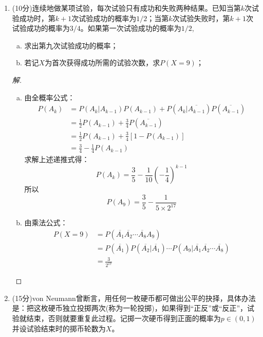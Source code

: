 \documentclass[12pt]{article}
\newcommand{\hei}{\CJKfamily{hei}}                          %
\begin{document}
\begin{enumerate}
\item {\hei (10分)连续地做某项试验，每次试验只有成功和失败两种结果。已知当第$k$次试验成功时，第$k+1$次试验成功的概率为$1/2$；当第$k$次试验失败时，第$k+1$次试验成功的概率为$3/4$。如果第一次试验成功的概率为$1/2$,
\begin{enumerate}[(a)]
	\item 求出第九次试验成功的概率；
	\item 若记$X$为首次获得成功所需的试验次数，求$P(X=9)$；
\end{enumerate}}
\begin{proof}[解]
	\begin{enumerate}[(a)]
		\item 由全概率公式：
		\begin{equation*}
		\begin{aligned}
		P(A_k)&=P(A_k|A_{k-1})P(A_{k-1})+P(A_k|\overline{A_{k-1}})P(\overline{A_{k-1}}) \\
		&=\frac{1}{2}P(A_{k-1})+\frac{3}{4}P(\overline{A_{k-1}}) \\
		&=\frac{1}{2}P(A_{k-1})+\frac{3}{4}[1-P(A_{k-1})] \\
		&=\frac{3}{4}-\frac{1}{4}P(A_{k-1})
		\end{aligned}
		\end{equation*}
		求解上述递推式得：
		\begin{equation*}
		P(A_k)=\frac{3}{5}-\frac{1}{10}\left(-\frac{1}{4}\right)^{k-1}
		\end{equation*}
		所以\begin{equation*}
		P(A_9)=\frac{3}{5}-\frac{1}{5\times 2^{17}}
		\end{equation*}
		\item 由乘法公式：
		\begin{equation*}
		\begin{aligned}
		P(X=9)&=P(\overline{A_{1}}\overline{A_{2}}\cdots \overline{A_{8}}A_9) \\
		&=P(\overline{A_{1}})P(\overline{A_{2}}|\overline{A_{1}})\cdots P(A_9|\overline{A_{1}}\overline{A_{2}}\cdots \overline{A_{8}}) \\
		&=\frac{3}{2^{17}}
		\end{aligned}
		\end{equation*}
	\end{enumerate}
\end{proof}
\item {\hei (15分)von Neumann曾断言，用任何一枚硬币都可做出公平的抉择，具体办法是：把这枚硬币独立投掷两次(称为一轮投掷)，如果得到“正反”或“反正”，试验就结束，否则就要重复此过程。记掷一次硬币得到正面的概率为$p\in (0,1)$并设试验结束时的掷币轮数为$X$。
}
\end{enumerate}
\end{document}
